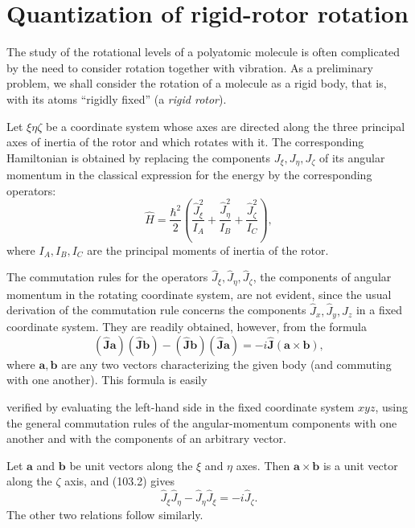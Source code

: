 \setcounter{section}{102}
\section{Quantization of rigid-rotor rotation}

The study of the rotational levels of a polyatomic molecule is often complicated by the need to consider rotation together with vibration. As a preliminary problem, we shall consider the rotation of a molecule as a rigid body, that is, with its atoms ``rigidly fixed'' (a \emph{rigid rotor}).

Let $\xi\eta\zeta$ be a coordinate system whose axes are directed along the three principal axes of inertia of the rotor and which rotates with it. The corresponding Hamiltonian is obtained by replacing the components $J_\xi,J_\eta,J_\zeta$ of its angular momentum in the classical expression for the energy by the corresponding operators:
\begin{equation}
 \hat H=\frac{\hbar^2}{2}\left(\frac{\hat J_\xi^2}{I_A}+\frac{\hat J_\eta^2}{I_B}+\frac{\hat J_\zeta^2}{I_C}\right), \tag{103.1}
\end{equation}
where $I_A,I_B,I_C$ are the principal moments of inertia of the rotor.

The commutation rules for the operators $\hat J_\xi,\hat J_\eta,\hat J_\zeta$, the components of angular momentum in the rotating coordinate system, are not evident, since the usual derivation of the commutation rule concerns the components $\hat J_x,\hat J_y,\hat J_z$ in a fixed coordinate system. They are readily obtained, however, from the formula
\begin{equation}
 (\hat{\mathbf J}\mathbf a)(\hat{\mathbf J}\mathbf b)-(\hat{\mathbf J}\mathbf b)(\hat{\mathbf J}\mathbf a)=-i\hat{\mathbf J}(\mathbf a\times\mathbf b), \tag{103.2}
\end{equation}
where $\mathbf a,\mathbf b$ are any two vectors characterizing the given body (and commuting with one another). This formula is easily

verified by evaluating the left-hand side in the fixed coordinate system $xyz$, using the general commutation rules of the angular-momentum components with one another and with the components of an arbitrary vector.

Let $\mathbf a$ and $\mathbf b$ be unit vectors along the $\xi$ and $\eta$ axes. Then $\mathbf a\times\mathbf b$ is a unit vector along the $\zeta$ axis, and (103.2) gives
\begin{equation}
 \hat J_\xi\hat J_\eta-\hat J_\eta\hat J_\xi=-i\hat J_\zeta. \tag{103.3}
\end{equation}
The other two relations follow similarly.


